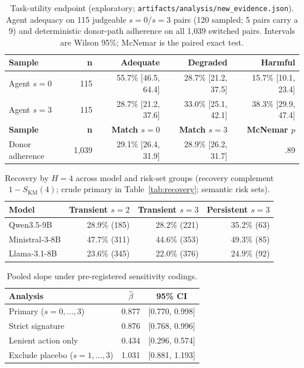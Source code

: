 \documentclass[a4paper,fleqn]{cas-sc}
\begin{document}
\begin{table}[pos=htbp]
  \centering
  \caption{Task-utility endpoint (exploratory; \texttt{artifacts/analysis/new\_evidence.json}).
  Agent adequacy on 115 judgeable $s=0$/$s=3$ pairs (120 sampled; 5 pairs carry a 9) and
  deterministic donor-path adherence on all 1{,}039 switched pairs. Intervals are Wilson
  95\%; McNemar is the paired exact test.}
  \label{tab:utility}
  \small
  \begin{tabular}{lrrrr}
    \toprule
    \textbf{Sample} & \textbf{n} & \textbf{Adequate} & \textbf{Degraded} & \textbf{Harmful} \\
    \midrule
    Agent $s=0$ & 115 & 55.7\% [46.5, 64.4] & 28.7\% [21.2, 37.5] & 15.7\% [10.1, 23.4] \\
    Agent $s=3$ & 115 & 28.7\% [21.2, 37.6] & 33.0\% [25.1, 42.1] & 38.3\% [29.9, 47.4] \\
    \midrule
    \textbf{Sample} & \textbf{n} & \textbf{Match $s=0$} & \textbf{Match $s=3$} & \textbf{McNemar $p$} \\
    \midrule
    Donor adherence & 1{,}039 & 29.1\% [26.4, 31.9] & 28.9\% [26.2, 31.7] & .89 \\
    \bottomrule
  \end{tabular}
\end{table}

\begin{table}[pos=htbp]
  \centering
  \caption{Recovery by $H=4$ across model and risk-set groups (recovery complement
  $1-S_{\mathrm{KM}}(4)$; crude primary in Table~\ref{tab:recovery}; semantic risk sets).}
  \label{tab:recovery_all}
  \small
  \begin{tabular}{lrrr}
    \toprule
    \textbf{Model} & \textbf{Transient $s=2$} & \textbf{Transient $s=3$} & \textbf{Persistent $s=3$} \\
    \midrule
    Qwen3.5-9B     & 28.9\% (185) & 28.2\% (221) & 35.2\% (63) \\
    Ministral-3-8B & 47.7\% (311) & 44.6\% (353) & 49.3\% (85) \\
    Llama-3.1-8B   & 23.6\% (345) & 22.0\% (376) & 24.9\% (92) \\
    \bottomrule
  \end{tabular}
\end{table}

\begin{table}[pos=htbp]
  \centering
  \caption{Pooled slope under pre-registered sensitivity codings.}
  \label{tab:sensitivity}
  \small
  \begin{tabular}{lcc}
    \toprule
    \textbf{Analysis} & $\hat\beta$ & \textbf{95\% CI} \\
    \midrule
    Primary ($s=0,\dots,3$) & 0.877 & [0.770, 0.998] \\
    Strict signature        & 0.876 & [0.768, 0.996] \\
    Lenient action only     & 0.434 & [0.296, 0.574] \\
    Exclude placebo ($s=1,\dots,3$) & 1.031 & [0.881, 1.193] \\
    \bottomrule
  \end{tabular}
\end{table}
\end{document}
